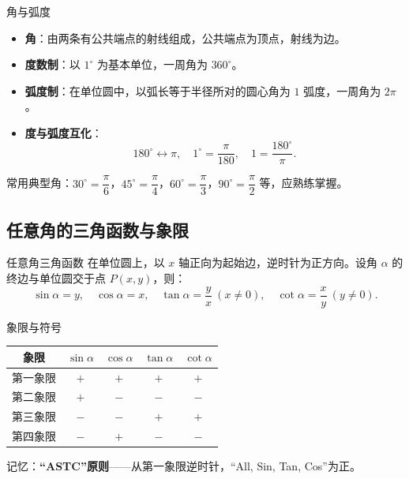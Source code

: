 \documentclass[a4paper,11pt]{ctexart}
\begin{document}
\begin{definitionbox}{角与弧度}
\begin{itemize}
  \item \textbf{角}：由两条有公共端点的射线组成，公共端点为顶点，射线为边。
  \item \textbf{度数制}：以 $1^\circ$ 为基本单位，一周角为 $360^\circ$。
  \item \textbf{弧度制}：在单位圆中，以弧长等于半径所对的圆心角为 $1$ 弧度，一周角为 $2\pi$。
  \item \textbf{度与弧度互化}：
  \[
    180^\circ \leftrightarrow \pi,\quad
    1^\circ = \frac{\pi}{180},\quad
    1 = \frac{180^\circ}{\pi}.
  \]
\end{itemize}
\end{definitionbox}

常用典型角：$30^\circ=\dfrac{\pi}{6}$，$45^\circ=\dfrac{\pi}{4}$，$60^\circ=\dfrac{\pi}{3}$，$90^\circ=\dfrac{\pi}{2}$ 等，应熟练掌握。

\subsection{任意角的三角函数与象限}

\begin{definitionbox}{任意角三角函数}
在单位圆上，以 $x$ 轴正向为起始边，逆时针为正方向。设角 $\alpha$ 的终边与单位圆交于点 $P(x,y)$，则：
\[
\sin\alpha = y,\quad \cos\alpha = x,\quad \tan\alpha = \frac{y}{x}\ (x\neq 0),\quad
\cot\alpha = \frac{x}{y}\ (y\neq 0).
\]
\end{definitionbox}

\begin{summarybox}{象限与符号}
\begin{center}
\begin{tabular}{c|cccc}
象限    & $\sin\alpha$ & $\cos\alpha$ & $\tan\alpha$ & $\cot\alpha$ \\
\hline
第一象限 & $+$        & $+$        & $+$        & $+$        \\
第二象限 & $+$        & $-$        & $-$        & $-$        \\
第三象限 & $-$        & $-$        & $+$        & $+$        \\
第四象限 & $-$        & $+$        & $-$        & $-$        \\
\end{tabular}
\end{center}
记忆：\textbf{“ASTC”原则}——从第一象限逆时针，“All, Sin, Tan, Cos”为正。
\end{summarybox}
\end{document}
